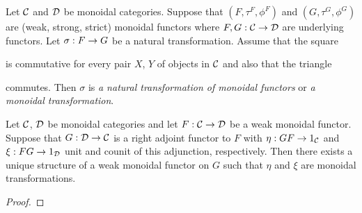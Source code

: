 \begin{definition}
Let ${\mathcal C}$ and ${\mathcal D}$ be monoidal categories. Suppose that $(F,\tau^F,\phi^F)$ and $(G,\tau^G,\phi^G)$ are (weak, strong, strict) monoidal functors where $F,G :{\mathcal C}\rightarrow {\mathcal D}$ are underlying functors. Let $\sigma:F\rightarrow G$ be a natural transformation. Assume that the square
\begin{center}
\end{center}
is commutative for every pair $X$, $Y$ of objects in ${\mathcal C}$ and also that the triangle
\begin{center}
\end{center}
commutes. Then $\sigma$ is \textit{a natural transformation of monoidal functors} or \textit{a monoidal transformation}. 
\end{definition}

\begin{proposition}
Let ${\mathcal C}$, ${\mathcal D}$ be monoidal categories and let $F:{\mathcal C}\rightarrow {\mathcal D}$ be a weak monoidal functor. Suppose that $G:{\mathcal D}\rightarrow {\mathcal C}$ is a right adjoint functor to $F$ with $\eta:GF\rightarrow 1_{{\mathcal C}}$ and $\xi:FG\rightarrow 1_{{\mathcal D}}$ unit and counit of this adjunction, respectively. Then there exists a unique structure of a weak monoidal functor on $G$ such that $\eta$ and $\xi$ are monoidal transformations.
\end{proposition}
\begin{proof}
\end{proof}


